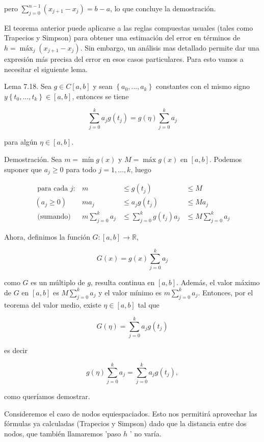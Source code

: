\documentclass[10pt]{book}
\begin{document}
pero $\sum_{j=0}^{n-1}\left(x_{j+1}-x_{j}\right)=b-a$, lo que concluye la demostración.

El teorema anterior puede aplicarse a las reglas compuestas usuales (tales como Trapecios y Simpson) para obtener una estimación del error en términos de $h=\operatorname{máx}_{j}\left(x_{j+1}-x_{j}\right)$. Sin embargo, un análisis mas detallado permite dar una expresión más precisa del error en esos casos particulares. Para esto vamos a necesitar el siguiente lema.

Lema 7.18. Sea $g \in C[a, b]$ y sean $\left\{a_{0}, \ldots, a_{k}\right\}$ constantes con el mismo signo $y\left\{t_{0}, \ldots, t_{k}\right\} \in [a, b]$, entonces se tiene

$$
\sum_{j=0}^{k} a_{j} g\left(t_{j}\right)=g(\eta) \sum_{j=0}^{k} a_{j}
$$

para algún $\eta \in[a, b]$.

Demostración. Sea $m=\operatorname{mín} g(x)$ y $M=\operatorname{máx} g(x)$ en $[a, b]$. Podemos suponer que $a_{j} \geq 0$ para todo $j=1, \ldots, k$, luego

$$
\begin{aligned}
\text { para cada } j: & m & \leq g\left(t_{j}\right) & \leq M \\
\left(a_{j} \geq 0\right) & m a_{j} & \leq a_{j} g\left(t_{j}\right) & \leq M a_{j} \\
\text { (sumando) } & m \sum_{j=0}^{k} a_{j} & \leq \sum_{j=0}^{k} g\left(t_{j}\right) a_{j} & \leq M \sum_{j=0}^{k} a_{j}
\end{aligned}
$$

Ahora, definimos la función $G:[a, b] \rightarrow \mathbb{R}$,

$$
G(x)=g(x) \sum_{j=0}^{k} a_{j}
$$

como $G$ es un múltiplo de $g$, resulta continua en $[a, b]$. Además, el valor máximo de $G$ en $[a, b]$ es $M \sum_{j=0}^{k} a_{j}$ y el valor mínimo es $m \sum_{j=0}^{k} a_{j}$. Entonces, por el teorema del valor medio, existe $\eta \in[a, b]$ tal que

$$
G(\eta)=\sum_{j=0}^{k} a_{j} g\left(t_{j}\right)
$$

es decir

$$
g(\eta) \sum_{j=0}^{k} a_{j}=\sum_{j=0}^{k} a_{j} g\left(t_{j}\right),
$$

como queríamos demostrar.

Consideremos el caso de nodos equiespaciados. Esto nos permitirá aprovechar las fórmulas ya calculadas (Trapecios y Simpson) dado que la distancia entre dos nodos, que también llamaremos 'paso $h$ ' no varía.
\end{document}
